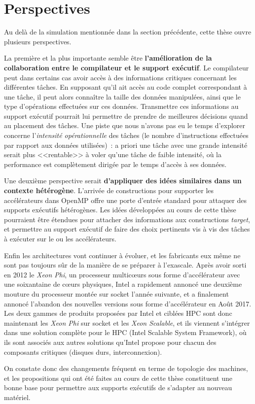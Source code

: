 \section*{Perspectives}

Au delà de la simulation mentionnée dans la section précédente, cette thèse ouvre plusieurs perspectives.

La première et la plus importante semble être \textbf{l'amélioration de la collaboration entre le compilateur et le support exécutif}.
Le compilateur peut dans certains cas avoir accès à des informations critiques concernant les différentes tâches.
En supposant qu'il ait accès au code complet correspondant à une tâche, il peut alors connaître la taille des données manipulées, ainsi que le type d'opérations effectuées sur ces données.
Transmettre ces informations au support exécutif pourrait lui permettre de prendre de meilleures décisions quand au placement des tâches.
Une piste que nous n'avons pas eu le temps d'explorer concerne l'\emph{intensité opérationnelle} des tâches (le nombre d'instructions effectuées par rapport aux données utilisées)~: a priori une tâche avec une grande intensité serait plus <<rentable>> à voler qu'une tâche de faible intensité, où la performance est complètement dirigée par le temps d'accès à ses données.

Une deuxième perspective serait \textbf{d'appliquer des idées similaires dans un contexte hétérogène}.
L'arrivée de constructions pour supporter les accélérateurs dans OpenMP offre une porte d'entrée standard pour attaquer des supports exécutifs hétérogènes.
Les idées développées au cours de cette thèse pourraient être étendues pour attacher des informations aux constructions \emph{target}, et permettre au support exécutif de faire des choix pertinents vis à vis des tâches à exécuter sur le ou les accélérateurs.

Enfin les architectures vont continuer à évoluer, et les fabricants eux même ne sont pas toujours sûr de la manière de se préparer à l'exascale.
Après avoir sorti en 2012 le \emph{Xeon Phi}, un processeur multicœurs sous forme d'accélérateur avec une soixantaine de cœurs physiques, Intel a rapidement annoncé une deuxième mouture du processeur montée sur socket l'année suivante, et a finalement annoncé l'abandon des nouvelles versions sous forme d'accélérateur en Août 2017.
Les deux gammes de produits proposées par Intel et ciblées HPC sont donc maintenant les \emph{Xeon Phi} sur socket et les \emph{Xeon Scalable}, et ils viennent s'intégrer dans une solution complète pour le HPC (Intel Scalable System Framework), où ils sont associés aux autres solutions qu'Intel propose pour chacun des composants critiques (disques durs, interconnexion).

On constate donc des changements fréquent en terme de topologie des machines, et les propositions qui ont été faites au cours de cette thèse constituent une bonne base pour permettre aux supports exécutifs de s'adapter au nouveau matériel.
